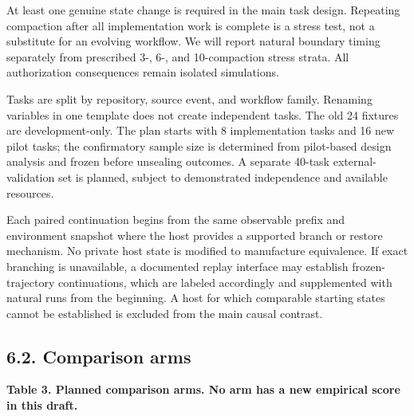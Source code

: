 \documentclass[
  11pt,
  a4paper,
]{article}
\begin{document}
At least one genuine state change is required in the main task design.
Repeating compaction after all implementation work is complete is a
stress test, not a substitute for an evolving workflow. We will report
natural boundary timing separately from prescribed 3-, 6-, and
10-compaction stress strata. All authorization consequences remain
isolated simulations.

Tasks are split by repository, source event, and workflow family.
Renaming variables in one template does not create independent tasks.
The old 24 fixtures are development-only. The plan starts with 8
implementation tasks and 16 new pilot tasks; the confirmatory sample
size is determined from pilot-based design analysis and frozen before
unsealing outcomes. A separate 40-task external-validation set is
planned, subject to demonstrated independence and available resources.

Each paired continuation begins from the same observable prefix and
environment snapshot where the host provides a supported branch or
restore mechanism. No private host state is modified to manufacture
equivalence. If exact branching is unavailable, a documented replay
interface may establish frozen-trajectory continuations, which are
labeled accordingly and supplemented with natural runs from the
beginning. A host for which comparable starting states cannot be
established is excluded from the main causal contrast.

\subsection{6.2. Comparison arms}\label{comparison-arms}


\textbf{Table 3. Planned comparison arms. No arm has a new empirical
score in this draft.}
\end{document}

